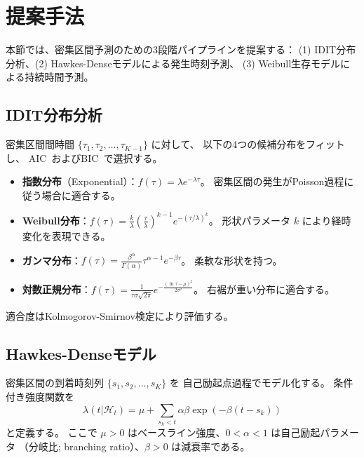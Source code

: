 \section{提案手法}\label{sec:method}

本節では、密集区間予測のための3段階パイプラインを提案する：
(1) IDIT分布分析、(2) Hawkes-Denseモデルによる発生時刻予測、
(3) Weibull生存モデルによる持続時間予測。

\subsection{IDIT分布分析}

密集区間間時間 $\{\tau_1, \tau_2, \ldots, \tau_{K-1}\}$ に対して、
以下の4つの候補分布をフィットし、
AIC~\cite{akaike1974new}およびBIC~\cite{schwarz1978estimating}で選択する。

\begin{itemize}
  \item \textbf{指数分布}（Exponential）：$f(\tau) = \lambda e^{-\lambda \tau}$。
    密集区間の発生がPoisson過程に従う場合に適合する。
  \item \textbf{Weibull分布}：$f(\tau) = \frac{k}{\lambda}\left(\frac{\tau}{\lambda}\right)^{k-1} e^{-(\tau/\lambda)^k}$。
    形状パラメータ $k$ により経時変化を表現できる。
  \item \textbf{ガンマ分布}：$f(\tau) = \frac{\beta^\alpha}{\Gamma(\alpha)} \tau^{\alpha-1} e^{-\beta \tau}$。
    柔軟な形状を持つ。
  \item \textbf{対数正規分布}：$f(\tau) = \frac{1}{\tau \sigma \sqrt{2\pi}} e^{-\frac{(\ln \tau - \mu)^2}{2\sigma^2}}$。
    右裾が重い分布に適合する。
\end{itemize}

適合度はKolmogorov-Smirnov検定により評価する。

\subsection{Hawkes-Denseモデル}

密集区間の到着時刻列 $\{s_1, s_2, \ldots, s_K\}$ を
自己励起点過程でモデル化する。
条件付き強度関数を
\begin{equation}\label{eq:hawkes-intensity}
  \lambda(t|\mathcal{H}_t) = \mu + \sum_{s_k < t} \alpha \beta \exp(-\beta(t - s_k))
\end{equation}
と定義する。
ここで $\mu > 0$ はベースライン強度、$0 < \alpha < 1$ は自己励起パラメータ
（分岐比; branching ratio）、$\beta > 0$ は減衰率である。


